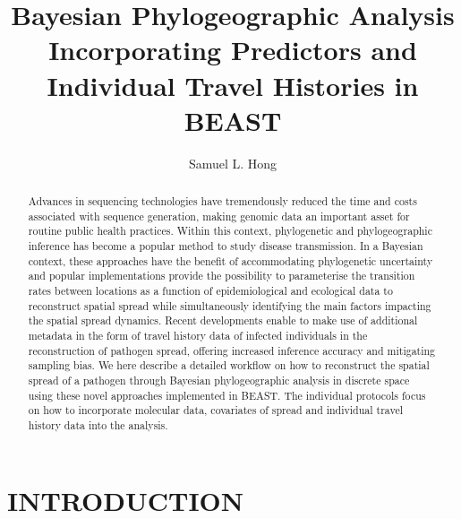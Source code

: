 \documentclass{article}
\title{Bayesian Phylogeographic Analysis Incorporating Predictors and Individual Travel Histories in BEAST}
\author{Samuel L. Hong}
\begin{document}
\maketitle

\begin{abstract}
\begin{adjustwidth}{0.5cm}{0.5cm}
Advances in sequencing technologies have tremendously reduced the time and costs associated with sequence generation, making genomic data an important asset for routine public health practices. Within this context, phylogenetic and phylogeographic inference has become a popular method to study disease transmission.
In a Bayesian context, these approaches have the benefit of accommodating phylogenetic uncertainty and popular implementations provide the possibility to parameterise the transition rates between locations as a function of epidemiological and ecological data to reconstruct spatial spread while simultaneously identifying the main factors impacting the spatial spread dynamics.
Recent developments enable to make use of additional metadata in the form of travel history data of infected individuals in the reconstruction of pathogen spread, offering increased inference accuracy and mitigating sampling bias.
We here describe a detailed workflow on how to reconstruct the spatial spread of a pathogen through Bayesian phylogeographic analysis in discrete space using these novel approaches implemented in BEAST.
The individual protocols focus on how to incorporate molecular data, covariates of spread and individual travel history data into the analysis. 
\end{adjustwidth}
\end{abstract}

\section*{INTRODUCTION}
\end{document}
